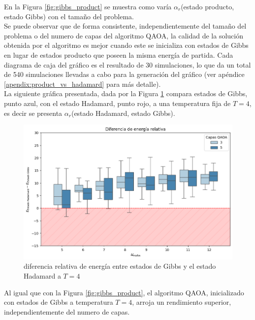 En la Figura \ref{fig:gibbs_product} se muestra como varía $\alpha_{r}$(estado producto, estado Gibbs) con el tamaño del problema. \\ 

Se puede observar que de forma consistente, independientemente del tamaño del problema o del numero de capas del algoritmo QAOA, la calidad de la solución obtenida por el algoritmo es mejor cuando este se inicializa con estados de Gibbs en lugar de estados producto que poseen la misma energía de partida. Cada diagrama de caja del gráfico es el resultado de 30 simulaciones, lo que da un total de 540 simulaciones llevadas a cabo para la generación del gráfico (ver apéndice \ref{apendix:product_vs_hadamard} para más detalle). \\

La siguiente gráfica presentada, dada por la Figura \ref{fig:gibbs_hadamard_nodes} compara estados de Gibbs,  punto azul, con el estado Hadamard, punto rojo, a una temperatura fija de $T=4$, es decir se presenta $\alpha_{r}$(estado Hadamard, estado Gibbs). 

\begin{figure}[!h]
    \centering
    \includegraphics[scale = 0.7]{plt/06-gibbs_vs_hadamard_nodes.png}
    \caption{diferencia relativa de energía entre estados de Gibbs y el estado Hadamard a $T=4$}
    \label{fig:gibbs_hadamard_nodes}
\end{figure}

Al igual que con la Figura \ref{fig:gibbs_product}, el algoritmo QAOA, inicializado con estados de Gibbs a temperatura $T=4$, arroja un rendimiento superior, independientemente del numero de capas. 

\newpage

